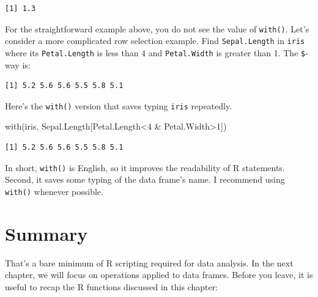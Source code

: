 \documentclass[
  letterpaper,
]{book}
\newenvironment{Shaded}{\begin{snugshade}}{\end{snugshade}}
\newcommand{\DecValTok}[1]{\textcolor[rgb]{0.68,0.00,0.00}{#1}}
\newcommand{\FunctionTok}[1]{\textcolor[rgb]{0.28,0.35,0.67}{#1}}
\newcommand{\NormalTok}[1]{\textcolor[rgb]{0.00,0.23,0.31}{#1}}
\newcommand{\SpecialCharTok}[1]{\textcolor[rgb]{0.37,0.37,0.37}{#1}}
\begin{document}
\begin{verbatim}
[1] 1.3
\end{verbatim}

For the straightforward example above, you do not see the value of
\texttt{with()}. Let's consider a more complicated row selection
example. Find \texttt{Sepal.Length} in \texttt{iris} where its
\texttt{Petal.Length} is less than 4 and \texttt{Petal.Width} is greater
than 1. The \texttt{\$}-way is:

\begin{Shaded}
\end{Shaded}

\begin{verbatim}
[1] 5.2 5.6 5.6 5.5 5.8 5.1
\end{verbatim}

Here's the \texttt{with()} version that saves typing \texttt{iris}
repeatedly.

\begin{Shaded}
\begin{Highlighting}[]
\FunctionTok{with}\NormalTok{(iris, Sepal.Length[Petal.Length}\SpecialCharTok{\textless{}}\DecValTok{4} \SpecialCharTok{\&}\NormalTok{ Petal.Width}\SpecialCharTok{\textgreater{}}\DecValTok{1}\NormalTok{])}
\end{Highlighting}
\end{Shaded}

\begin{verbatim}
[1] 5.2 5.6 5.6 5.5 5.8 5.1
\end{verbatim}

In short, \texttt{with()} is English, so it improves the readability of
R statements. Second, it saves some typing of the data frame's name. I
recommend using \texttt{with()} whenever possible.

\section*{Summary}\label{summary}


That's a bare minimum of R scripting required for data analysis. In the
next chapter, we will focus on operations applied to data frames. Before
you leave, it is useful to recap the R functions discussed in this
chapter:
\end{document}
